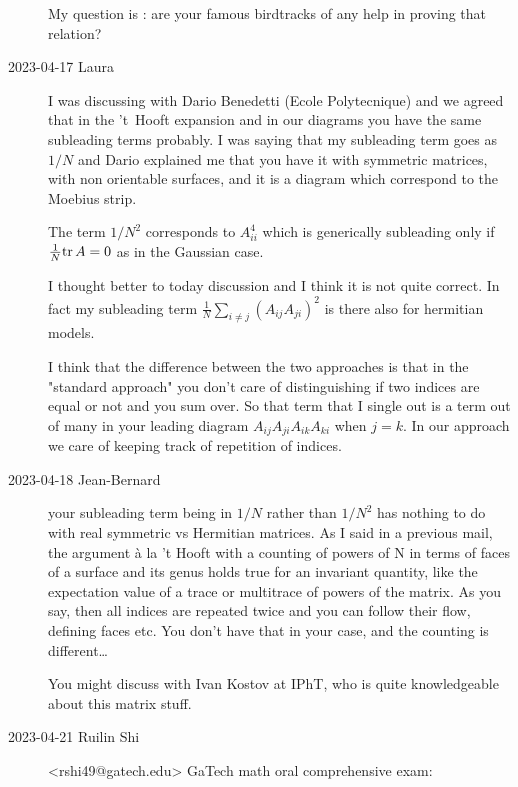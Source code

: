 \begin{description}
My question is : are your famous birdtracks of any help in proving that relation?

   \item[2023-04-17 Laura]
I was discussing with Dario Benedetti (Ecole Polytecnique) and we agreed that in the
't~Hooft expansion and in our diagrams you have the same subleading terms probably.
I was saying that my subleading term goes as $1/N$ and Dario explained
me that you have it with symmetric matrices, with non orientable surfaces,
and it is a diagram which correspond to the Moebius strip.

The term $1/N^2$ corresponds to $A_{ii}^4$ which is generically subleading only if\\
$\frac{1}{N}\mathrm{tr}\, A=0$ as in the Gaussian case.

I thought better to today discussion and I think it is not quite correct.
In fact my subleading term
$\frac{1}{N} \sum_{i \ne j} (A_{ij} A_{ji})^2$ is there also for hermitian models.

I think that the difference between the two approaches is that in the
"standard approach" you don't care of distinguishing if two indices are equal
or not and you sum over. So that term that I single out is a term out of many
in your leading diagram
$A_{ij} A_{ji} A_{ik} A_{ki}$ when $j=k$.
In our approach we care of keeping track of repetition of indices.

   \item[2023-04-18 Jean-Bernard]
your subleading term being in $1/N$ rather than $1/N^2$
has nothing to do with real symmetric vs Hermitian matrices.
As I said in a previous mail, the argument à la 't Hooft with a counting
of powers of N in terms of faces of a surface and its genus
holds true for an invariant quantity, like the expectation value of a
trace or multitrace of powers of the matrix. As you say, then all indices
are repeated twice and you can follow their flow, defining faces etc.
You don't have that in your case, and the counting is different…

You might discuss
with
{Ivan Kostov} at IPhT, who is quite knowledgeable about this matrix stuff.

   \item[2023-04-21 Ruilin Shi]
 <rshi49@gatech.edu> GaTech math oral comprehensive exam:


\end{description}
